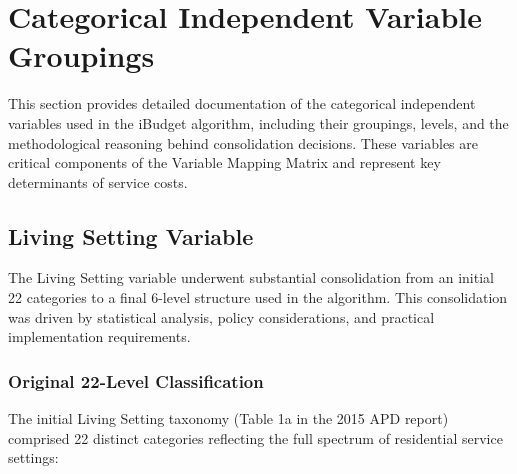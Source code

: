 \section{Categorical Independent Variable Groupings}
\label{sec:categorical-groupings}

This section provides detailed documentation of the categorical independent variables used in the iBudget algorithm, including their groupings, levels, and the methodological reasoning behind consolidation decisions. These variables are critical components of the Variable Mapping Matrix and represent key determinants of service costs.

\subsection{Living Setting Variable}
\label{subsec:living-setting-groupings}

The Living Setting variable underwent substantial consolidation from an initial 22 categories to a final 6-level structure used in the algorithm. This consolidation was driven by statistical analysis, policy considerations, and practical implementation requirements.

\subsubsection{Original 22-Level Classification}

The initial Living Setting taxonomy (Table 1a in the 2015 APD report) comprised 22 distinct categories reflecting the full spectrum of residential service settings:

